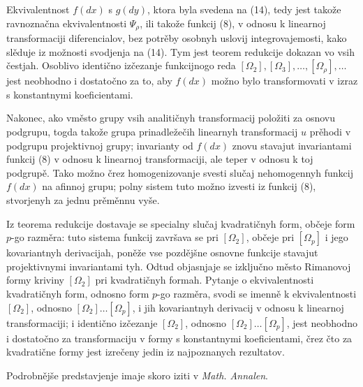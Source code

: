 \documentclass[11pt]{article}
\begin{document}
Ekvivalentnost \(f(dx)\) s \(g(dy)\), ktora byla svedena na (14), tedy jest takože ravnoznačna ekvivalentnosti \(\Psi_\rho\), ili takože funkcij (8), v odnosu k linearnoj transformaciji diferencialov, bez potrěby osobnyh uslovij integrovajemosti, kako slěduje iz možnosti svodjenja na (14). Tym jest teorem redukcije dokazan vo vsih čestjah. Osoblivo identično izčezanje funkcijnogo reda \([\Omega_2],[\Omega_3],\ldots,[\Omega_\rho],\ldots\) jest neobhodno i dostatočno za to, aby \(f(dx)\) možno bylo transformovati v izraz s konstantnymi koeficientami.

Nakonec, ako vměsto grupy vsih analitičnyh transformacij položiti za osnovu podgrupu, togda takože grupa prinadležečih linearnyh transformacij \(u\) prěhodi v podgrupu projektivnoj grupy; invarianty od \(f(dx)\) znovu stavajut invariantami funkcij (8) v odnosu k linearnoj transformaciji, ale teper v odnosu k toj podgrupě. Tako možno črez homogenizovanje svesti slučaj nehomogennyh funkcij \(f(dx)\) na afinnoj grupu; polny sistem tuto možno izvesti iz funkcij (8), stvorjenyh za jednu prěměnnu vyše.

Iz teorema redukcije dostavaje se specialny slučaj kvadratičnyh form, občeje form \(p\)-go razměra: tuto sistema funkcij završava se pri \([\Omega_2]\), občeje pri \([\Omega_p]\) i jego kovariantnyh derivacijah, poněže vse pozdějšne osnovne funkcije stavajut projektivnymi invariantami tyh. Odtud objasnjaje se izključno město Rimanovoj formy kriviny \([\Omega_2]\) pri kvadratičnyh formah. Pytanje o ekvivalentnosti kvadratičnyh form, odnosno form \(p\)-go razměra, svodi se imenně k ekvivalentnosti \([\Omega_2]\), odnosno \([\Omega_2]\ldots[\Omega_p]\), i jih kovariantnyh derivacij v odnosu k linearnoj transformaciji; i identično izčezanje \([\Omega_2]\), odnosno \([\Omega_2]\ldots[\Omega_p]\), jest neobhodno i dostatočno za transformaciju v formy s konstantnymi koeficientami, črez čto za kvadratične formy jest izrečeny jedin iz najpoznanych rezultatov.

Podrobnějše predstavjenje imaje skoro iziti v \emph{Math. Annalen}.

\clearpage
\end{document}
